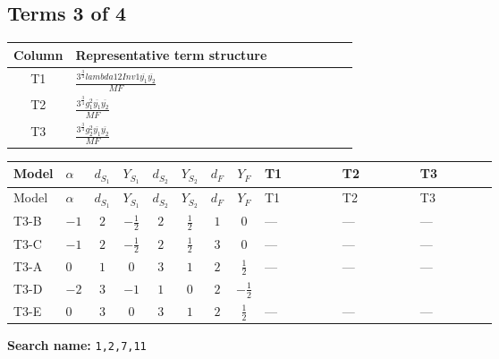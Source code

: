 \documentclass[8pt]{article}
\begin{document}
\begin{landscape}
\subsection*{Terms 3 of 4}
\begin{center}
\begin{tabular}{@{}c >{\raggedright\arraybackslash}p{0.82\linewidth}@{}}
\toprule
Column & Representative term structure \\
\midrule
T1 & \(\displaystyle \frac{3^{\frac{3}{4}} lambda12Inv1 \overline{y_{1}} \overline{y_{2}}}{MF}\) \\
\midrule
T2 & \(\displaystyle \frac{3^{\frac{3}{4}} g_{1}^{2} \overline{y_{1}} \overline{y_{2}}}{MF}\) \\
\midrule
T3 & \(\displaystyle \frac{3^{\frac{3}{4}} g_{2}^{2} \overline{y_{1}} \overline{y_{2}}}{MF}\) \\
\midrule
\bottomrule
\end{tabular}
\end{center}
\smallskip
\tiny
\begin{longtable}{@{}llcccccc >{\raggedright\arraybackslash}p{0.21\linewidth} >{\raggedright\arraybackslash}p{0.21\linewidth} >{\raggedright\arraybackslash}p{0.21\linewidth}@{}}
\toprule
Model & $\alpha$ & $d_{S_1}$ & $Y_{S_1}$ & $d_{S_2}$ & $Y_{S_2}$ & $d_F$ & $Y_F$ & T1 & T2 & T3 \\
\midrule
\endfirsthead
\toprule
Model & $\alpha$ & $d_{S_1}$ & $Y_{S_1}$ & $d_{S_2}$ & $Y_{S_2}$ & $d_F$ & $Y_F$ & T1 & T2 & T3 \\
\midrule
\endhead
T3-B & $-1$ & $2$ & $-\frac{1}{2}$ & $2$ & $\frac{1}{2}$ & $1$ & $0$ & --- & --- & --- \\
\midrule
T3-C & $-1$ & $2$ & $-\frac{1}{2}$ & $2$ & $\frac{1}{2}$ & $3$ & $0$ & --- & --- & --- \\
\midrule
T3-A & $0$ & $1$ & $0$ & $3$ & $1$ & $2$ & $\frac{1}{2}$ & --- & --- & --- \\
\midrule
T3-D & $-2$ & $3$ & $-1$ & $1$ & $0$ & $2$ & $-\frac{1}{2}$ & \scriptsize\adjustbox{max width=\linewidth}{$\begin{gathered} \frac{3^{\frac{3}{4}} lambda12Inv1 \overline{y_{1}} \overline{y_{2}}}{6 MF}\end{gathered}$} & \scriptsize\adjustbox{max width=\linewidth}{$\begin{gathered} \frac{3^{\frac{3}{4}} g_{1}^{2} \overline{y_{1}} \overline{y_{2}}}{8 MF}\end{gathered}$} & \scriptsize\adjustbox{max width=\linewidth}{$\begin{gathered} \frac{25 \cdot 3^{\frac{3}{4}} g_{2}^{2} \overline{y_{1}} \overline{y_{2}}}{24 MF}\end{gathered}$} \\
\midrule
T3-E & $0$ & $3$ & $0$ & $3$ & $1$ & $2$ & $\frac{1}{2}$ & --- & --- & --- \\
\midrule
\bottomrule
\end{longtable}
\clearpage
\noindent\textbf{Search name: }\texttt{1,2,7,11}\par\smallskip

\end{landscape}
\end{document}
